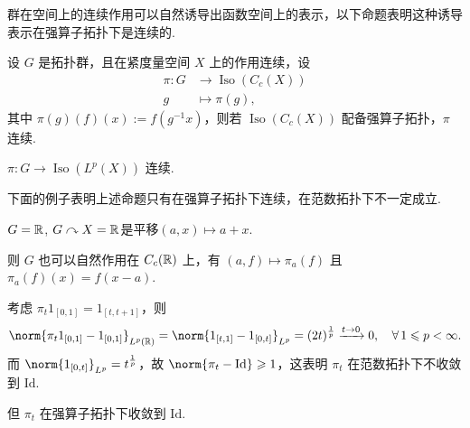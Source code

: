 群在空间上的连续作用可以自然诱导出函数空间上的表示，以下命题表明这种诱导表示在强算子拓扑下是连续的.

\begin{proposition}
设 $G$ 是拓扑群，且在紧度量空间 $X$ 上的作用连续，设
\begin{align*}
\pi: G &\to \operatorname{Iso}(C_c(X))\\[-6pt]
g &\mapsto \pi(g),
\end{align*}
其中 $\pi(g)(f)(x) := f(g^{-1}x)$，则若 $\operatorname{Iso}(C_c(X))$ 配备强算子拓扑，$\pi$ 连续.
\end{proposition}

\begin{corollary}
$\pi: G \to \operatorname{Iso}(L^p(X))$ 连续.
\end{corollary}

下面的例子表明上述命题只有在强算子拓扑下连续，在范数拓扑下不一定成立.
\begin{instance}
$G = \mathbb{R}$, $G \curvearrowright X = \mathbb{R}$是平移$(a,x) \mapsto a+x$.\par
则 $G$ 也可以自然作用在 $C_c(\mathbb{R})$ 上，有 $(a,f) \mapsto \pi_a(f)$ 且 $\pi_a(f)(x) = f(x-a)$.\par
考虑 $\pi_t 1_{[0,1]} = 1_{[t,t+1]}$，则
\begin{equation*}
\norm{\pi_t 1_{[0,1]} - 1_{[0,1]}}_{L^p(\mb{R})} = \norm{1_{[t,1]} - 1_{[0,t]}}_{L^p} = (2t)^{\frac{1}{p}} \xrightarrow{t \to 0} 0, \quad \forall\, 1 \leq p < \infty.
\end{equation*}
而 $\norm{1_{[0,t]}}_{L^p} = t^{\frac{1}{p}}$，故 $\norm{\pi_t - \mathrm{Id}} \geq 1$，这表明 $\pi_t$ 在范数拓扑下不收敛到 $\mathrm{Id}$.\par
但 $\pi_t$ 在强算子拓扑下收敛到 $\mathrm{Id}$.
\end{instance}




